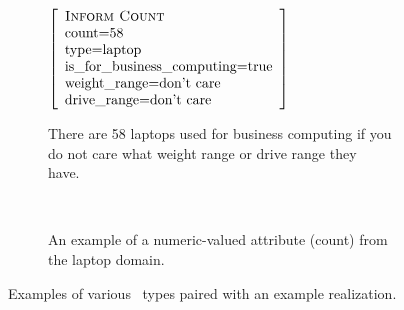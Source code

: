 \begin{figure}
~\\
~\\
~\\



\begin{subfigure}{\textwidth}
    \begin{minipage}{0.5\textwidth}
 \center
$\left[\begin{array}{l} 
    \textsc{Inform Count} \\ 
    \textrm{count=$58$} \\
    \textrm{type=laptop} \\
    \textrm{is\_for\_business\_computing=true} \\
    \textrm{weight\_range=don't care} \\
    \textrm{drive\_range=don't care} \\
\end{array}\right]$ 
\end{minipage}
\begin{minipage}{0.5\textwidth}
There are 58 laptops used for business computing if you do not care what 
weight range or drive range they have.
\end{minipage}

~\\


\caption{An example of a numeric-valued attribute (count) from the laptop domain.}
\end{subfigure}  

   
\caption{Examples of various \attributevalue~types paired with an example
realization.}
\end{figure}


